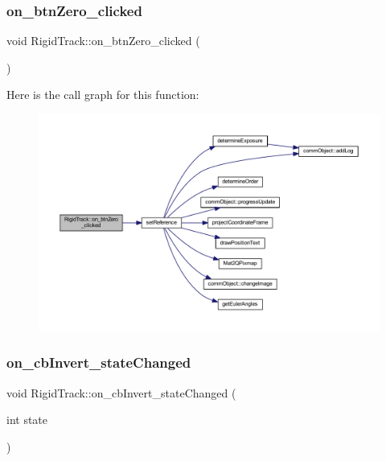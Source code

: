 \subsubsection{\texorpdfstring{on\+\_\+btn\+Zero\+\_\+clicked}{on\_btnZero\_clicked}}
{\footnotesize\ttfamily void Rigid\+Track\+::on\+\_\+btn\+Zero\+\_\+clicked (\begin{DoxyParamCaption}{ }\end{DoxyParamCaption})\hspace{0.3cm}{\ttfamily [slot]}}

Here is the call graph for this function\+:
\nopagebreak
\begin{figure}[H]
\begin{center}
\leavevmode
\includegraphics[width=350pt]{class_rigid_track_afb1a4edcacc818db4ec6bb017dd07e0f_cgraph}
\end{center}
\end{figure}
\mbox{\label{class_rigid_track_ab347b3edeca55685f4d601549596d44a}} 
\subsubsection{\texorpdfstring{on\+\_\+cb\+Invert\+\_\+state\+Changed}{on\_cbInvert\_stateChanged}}
{\footnotesize\ttfamily void Rigid\+Track\+::on\+\_\+cb\+Invert\+\_\+state\+Changed (\begin{DoxyParamCaption}\item[{int}]{state }\end{DoxyParamCaption})\hspace{0.3cm}{\ttfamily [slot]}}

